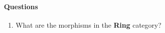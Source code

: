 \documentclass{article} %
\begin{document}
\paragraph{Questions}
\begin{enumerate}
	\item What are the morphisms in the \textbf{ Ring } category?
\end{enumerate}
\end{document}

